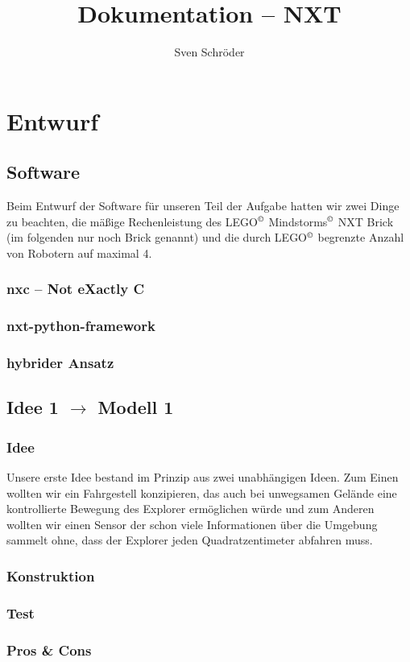 \documentclass[10pt,a4paper]{scrartcl}
\author{Sven Schröder}
\title{Dokumentation -- NXT}
\begin{document}
\maketitle
\tableofcontents
\section{Entwurf}
\subsection{Software}
Beim Entwurf der Software für unseren Teil der Aufgabe hatten wir zwei Dinge zu beachten, die mäßige Rechenleistung des LEGO$^\copyright$ Mindstorms$^\copyright$ NXT Brick (im folgenden nur noch Brick genannt) und die durch LEGO$^\copyright$ begrenzte Anzahl von Robotern auf maximal 4.  
\subsubsection{nxc -- Not eXactly C}
\subsubsection{nxt-python-framework}
\subsubsection{hybrider Ansatz}
\subsection{Idee 1 $\rightarrow$ Modell 1}%
\subsubsection{Idee}
Unsere erste Idee bestand im Prinzip aus zwei unabhängigen Ideen. Zum Einen wollten wir ein Fahrgestell konzipieren, das auch bei unwegsamen Gelände eine kontrollierte Bewegung des Explorer ermöglichen würde und zum Anderen wollten wir einen Sensor der schon viele Informationen über die Umgebung sammelt ohne, dass der Explorer jeden Quadratzentimeter abfahren muss.
\subsubsection{Konstruktion}
\subsubsection{Test}
\subsubsection{Pros \& Cons}
\end{document}
